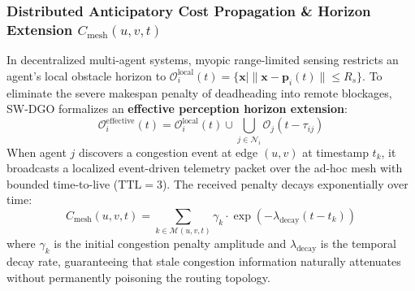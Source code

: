 \documentclass[journal]{IEEEtran}
\begin{document}
\subsubsection{Distributed Anticipatory Cost Propagation \& Horizon Extension \texorpdfstring{$C_{\text{mesh}}(u, v, t)$}{C\_mesh(u, v, t)}}
In decentralized multi-agent systems, myopic range-limited sensing restricts an agent's local obstacle horizon to $\mathcal{O}_i^{\text{local}}(t) = \{\mathbf{x} \mid \|\mathbf{x} - \mathbf{p}_i(t)\| \le R_s\}$. To eliminate the severe makespan penalty of deadheading into remote blockages, SW-DGO formalizes an \textbf{effective perception horizon extension}:
\begin{equation}
\mathcal{O}_i^{\text{effective}}(t) = \mathcal{O}_i^{\text{local}}(t) \cup \bigcup_{j \in \mathcal{N}_i} \mathcal{O}_j(t - \tau_{ij})
\end{equation}
When agent $j$ discovers a congestion event at edge $(u, v)$ at timestamp $t_k$, it broadcasts a localized event-driven telemetry packet over the ad-hoc mesh with bounded time-to-live ($\text{TTL} = 3$). The received penalty decays exponentially over time:
\begin{equation}
C_{\text{mesh}}(u, v, t) = \sum_{k \in \mathcal{M}(u, v, t)} \gamma_k \cdot \exp\left(-\lambda_{\text{decay}} (t - t_k)\right)
\end{equation}
where $\gamma_k$ is the initial congestion penalty amplitude and $\lambda_{\text{decay}}$ is the temporal decay rate, guaranteeing that stale congestion information naturally attenuates without permanently poisoning the routing topology.
\end{document}
